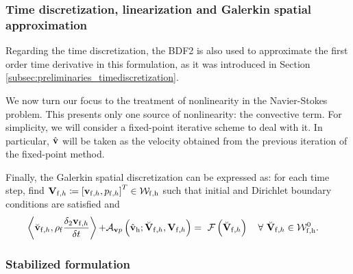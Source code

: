 \documentclass[11pt,english]{article}
\def\densfluid{\rho_{\rm{f}}}                %
\def\vhat{\hat{\vb{v}}}
\def\testfluidh{\breve{\vb{V}}_{{\rm f} ,h}}
\def\testvfluidh{\breve{\vb{v}}_{{\rm f} ,h}}
\def\unknofluidh{\vb{V}_{\mathrm{f},h}}
\def\vfluidh{\vb{v}_{{\mathrm{f}},h}}
\def\pfluidh{p_{{\mathrm{f}},h}}
\def\vhath{\hat{\vb{v}}_{\rm{h}}}
\def\unknofluidspaceh{\mathcal{W}_{\rm{f},\rm{h}}}        %
\def\testfluidspaceh{\mathcal{W}_{\rm{f},\rm{h}}^{0}}     %
\def\vp{\vb{v}p}
\begin{document}
\subsubsection{Time discretization, linearization and Galerkin spatial approximation \label{subsubsec:vp_navier-stokes_time_space_linearization}}

Regarding the time discretization, the BDF2 is also used to approximate the first order time derivative in this formulation, as it was introduced in Section \ref{subsec:preliminaries_timediscretization}.

We now turn our focus to the treatment of nonlinearity in the Navier-Stokes problem. This presents only one source of nonlinearity: the convective term. For simplicity, we will consider a fixed-point iterative scheme to deal with it. In particular, $\vhat$ will  be taken as the velocity obtained from the previous iteration of the fixed-point method.

Finally, the Galerkin spatial discretization can be expressed as:  for each time step, find $\unknofluidh \coloneqq \left [ \vfluidh, \pfluidh \right ]^T \in  \unknofluidspaceh $ such that initial and Dirichlet boundary conditions are satisfied and
\begin{align*}
\begin{split}
  \left \langle  \testvfluidh, \densfluid\frac{\delta_2 \vfluidh}{\delta t} \right \rangle +&  \mathcal{A}_{\vp} \left (\vhath;  \testfluidh, \unknofluidh \right) 
   =  ~\mathcal{F} \left ( \testfluidh  \right) \quad \forall \ \testfluidh \in \testfluidspaceh.
\end{split}
\end{align*}


\subsubsection{Stabilized formulation}
\end{document}

